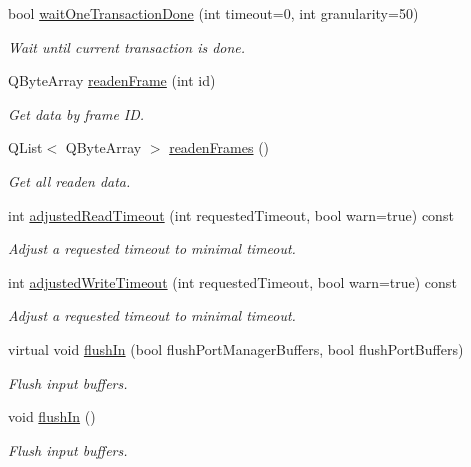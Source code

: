 \begin{DoxyCompactItemize}
bool \hyperlink{classmdt_port_manager_aeb8a98c8bf4ce8279bd897dece6d731a}{waitOneTransactionDone} (int timeout=0, int granularity=50)
\begin{DoxyCompactList}\small\item\em Wait until current transaction is done. \end{DoxyCompactList}\item 
QByteArray \hyperlink{classmdt_port_manager_a830ae182d06dd6a52c43a7f45b9240ac}{readenFrame} (int id)
\begin{DoxyCompactList}\small\item\em Get data by frame ID. \end{DoxyCompactList}\item 
QList$<$ QByteArray $>$ \hyperlink{classmdt_port_manager_addd5dcae9644cea42a9871205af41796}{readenFrames} ()
\begin{DoxyCompactList}\small\item\em Get all readen data. \end{DoxyCompactList}\item 
int \hyperlink{classmdt_port_manager_a7cb3155940e23db0122d14f21fca858d}{adjustedReadTimeout} (int requestedTimeout, bool warn=true) const 
\begin{DoxyCompactList}\small\item\em Adjust a requested timeout to minimal timeout. \end{DoxyCompactList}\item 
int \hyperlink{classmdt_port_manager_a9d6782be514745a1b1392216d17d41df}{adjustedWriteTimeout} (int requestedTimeout, bool warn=true) const 
\begin{DoxyCompactList}\small\item\em Adjust a requested timeout to minimal timeout. \end{DoxyCompactList}\item 
virtual void \hyperlink{classmdt_port_manager_ac0844a5cd4043a95a479d458ac7ce590}{flushIn} (bool flushPortManagerBuffers, bool flushPortBuffers)
\begin{DoxyCompactList}\small\item\em Flush input buffers. \end{DoxyCompactList}\item 
void \hyperlink{classmdt_port_manager_a4c44ce6ec40c4afc6be441c10d7ee827}{flushIn} ()
\begin{DoxyCompactList}\small\item\em Flush input buffers. \end{DoxyCompactList}\item 

\end{DoxyCompactItemize}
